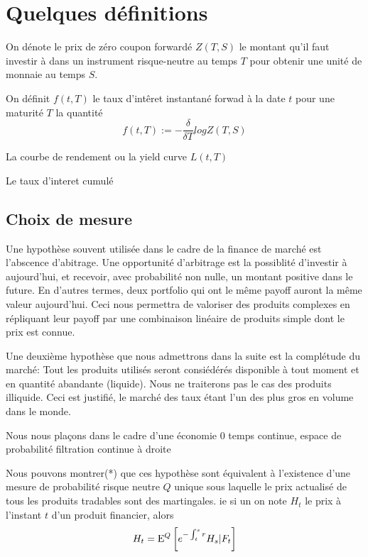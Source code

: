 

\section{Quelques définitions}


\begin{defn}
On dénote le prix de zéro coupon forwardé $Z(T, S)$ le montant qu'il faut investir à dans un instrument risque-neutre au temps $T$ pour obtenir une unité de monnaie au temps $S$.
\end{defn}

\begin{defn}
On définit $f(t, T)$ le taux d'intêret instantané forwad à la date $t$ pour une maturité $T$ la quantité $$f(t, T) := - \frac{ \delta}{\delta T}  log Z(T, S)$$
\end{defn}
\begin{defn}
La courbe de rendement ou la yield curve $L(t, T)$
\end{defn}
\begin{defn}
Le taux d'interet cumulé
\end{defn}

\subsection{Choix de mesure}

Une hypothèse souvent utilisée dans le cadre de la finance de marché est l'abscence d'abitrage. Une opportunité d'arbitrage est la possiblité d'investir à aujourd'hui, et recevoir, avec probabilité non nulle, un montant positive dans le future. En d'autres termes, deux portfolio qui ont le même payoff auront la même valeur aujourd'hui. Ceci nous permettra de valoriser des produits complexes en répliquant leur payoff par une combinaison linéaire de produits simple dont le prix est connue.

Une deuxième hypothèse que nous admettrons dans la suite est la complétude du marché: Tout les produits utilisés seront consiédérés disponible à tout moment et en quantité abandante (liquide). Nous ne traiterons pas le cas des produits illiquide. Ceci est justifié, le marché des taux étant l'un des plus gros en volume dans le monde.

Nous nous plaçons dans le cadre d'une économie 0 temps continue,
espace de probabilité
filtration continue à droite


Nous pouvons montrer(*) que ces hypothèse sont équivalent à l'existence d'une mesure de probabilité risque neutre $Q$ unique sous laquelle le prix actualisé de tous les produits tradables sont des martingales. ie si un on note $H_t$ le prix à l'instant $t$ d'un produit financier, alors
$$H_t =\mathrm{E}^Q \left[  e^{-\int_t^s r} H_s | F_t  \right] $$

